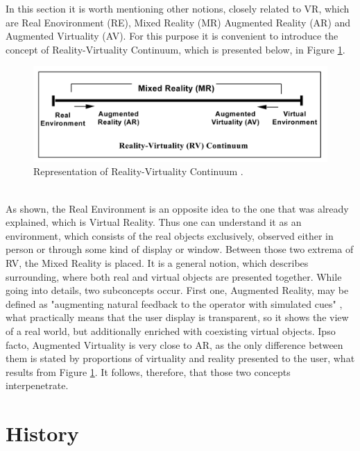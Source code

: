 	In this section it is worth mentioning other notions, closely related to VR, which are Real Enovironment (RE), Mixed Reality (MR) Augmented Reality (AR) and Augmented Virtuality (AV). For this purpose it is convenient to introduce the concept of Reality-Virtuality Continuum, which is presented below, in Figure \ref{fig:continuum}.
\begin{figure}[h] 
\centering    
\includegraphics[width=1.0\textwidth]{Figs/rv_continuum.jpg}
\caption{Representation of Reality-Virtuality Continuum \cite{Milgram94}.}
\label{fig:continuum}
\end{figure}
\\As shown, the Real Environment is an opposite idea to the one that was already explained, which is Virtual Reality. Thus one can understand it as an environment, which consists of the real objects exclusively, observed either in person or through some kind of display or window. Between those two extrema of RV, the Mixed Reality is placed. It is a general notion, which describes surrounding, where both real and virtual objects are presented together. While going into details, two subconcepts occur. First one, Augmented Reality, may be defined as "augmenting natural feedback to the operator with simulated cues" \cite{Milgram94}, what practically means that the user display is transparent, so it shows the view of a real world, but additionally enriched with coexisting virtual objects. Ipso facto, Augmented Virtuality is very close to AR, as the only difference between them is stated by proportions of virtuality and reality presented to the user, what results from Figure \ref{fig:continuum}. It follows, therefore, that those two concepts interpenetrate.


	 
\section{History}\label{history} %

